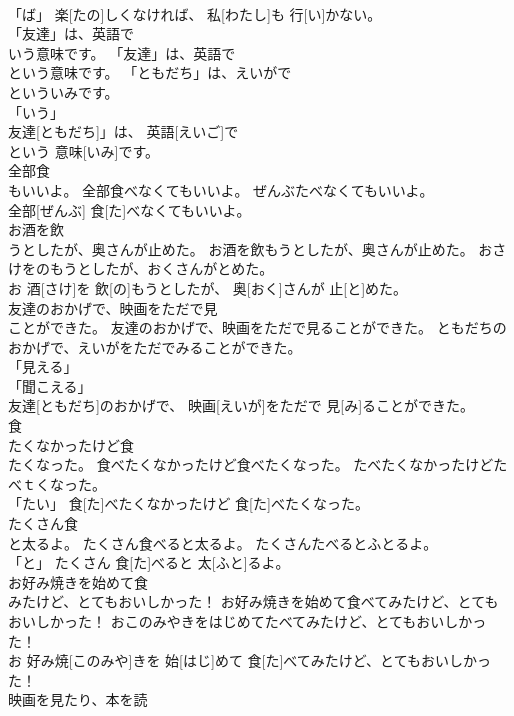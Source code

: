 \documentclass[8pt]{extreport}
\begin{document}
\begin{CJK}{UTF8}{min}
\\	「ば」	楽[たの]しくなければ、 私[わたし]も 行[い]かない。		
\\	「友達」は、英語で
\\	いう意味です。	「友達」は、英語で
\\	という意味です。	「ともだち」は、えいがで
\\	といういみです。	
\\	「いう」 
\\	友達[ともだち]」は、 英語[えいご]で
\\	という 意味[いみ]です。		
\\	全部食
\\	もいいよ。	全部食べなくてもいいよ。	ぜんぶたべなくてもいいよ。	
\\	全部[ぜんぶ] 食[た]べなくてもいいよ。		
\\	お酒を飲
\\	うとしたが、奥さんが止めた。	お酒を飲もうとしたが、奥さんが止めた。	おさけをのもうとしたが、おくさんがとめた。	
\\	お 酒[さけ]を 飲[の]もうとしたが、 奥[おく]さんが 止[と]めた。		
\\	友達のおかげで、映画をただで見
\\	ことができた。	友達のおかげで、映画をただで見ることができた。	ともだちのおかげで、えいがをただでみることができた。	
\\	「見える」 
\\	「聞こえる」 
\\	友達[ともだち]のおかげで、 映画[えいが]をただで 見[み]ることができた。		
\\	食
\\	たくなかったけど食
\\	たくなった。	食べたくなかったけど食べたくなった。	たべたくなかったけどたべｔくなった。	
\\	「たい」	食[た]べたくなかったけど 食[た]べたくなった。		
\\	たくさん食
\\	と太るよ。	たくさん食べると太るよ。	たくさんたべるとふとるよ。	
\\	「と」	たくさん 食[た]べると 太[ふと]るよ。		
\\	お好み焼きを始めて食
\\	みたけど、とてもおいしかった！	お好み焼きを始めて食べてみたけど、とてもおいしかった！	おこのみやきをはじめてたべてみたけど、とてもおいしかった！	
\\	お 好み焼[このみや]きを 始[はじ]めて 食[た]べてみたけど、とてもおいしかった！		
\\	映画を見たり、本を読

\end{CJK}
\end{document}

